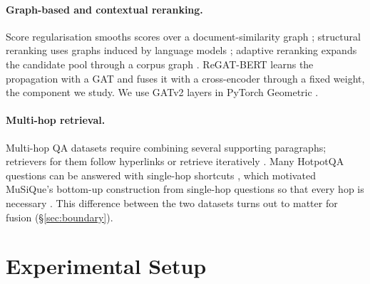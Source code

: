 \documentclass[11pt]{article}
\begin{document}
\paragraph{Graph-based and contextual reranking.}
Score regularisation smooths scores over a document-similarity graph \citep{diaz2005regularizing};
structural reranking uses graphs induced by language models \citep{kurland2005pagerank}; adaptive
reranking expands the candidate pool through a corpus graph \citep{macavaney2022gar}. ReGAT-BERT
\citep{regatbert} learns the propagation with a GAT and fuses it with a cross-encoder through a fixed
weight, the component we study. We use GATv2 layers \citep{brody2022gatv2} in PyTorch Geometric
\citep{fey2019pyg}.

\paragraph{Multi-hop retrieval.}
Multi-hop QA datasets \citep{yang2018hotpotqa,ho2020constructing,trivedi2022musique} require combining
several supporting paragraphs; retrievers for them follow hyperlinks or retrieve iteratively
\citep{asai2020learning,xiong2021mdr}. Many HotpotQA questions can be answered with single-hop
shortcuts \citep{min2019compositional}, which motivated MuSiQue's bottom-up construction from
single-hop questions so that every hop is necessary \citep{trivedi2022musique}. This difference
between the two datasets turns out to matter for fusion (\S\ref{sec:boundary}).

\section{Experimental Setup}
\label{sec:setup}
\end{document}

